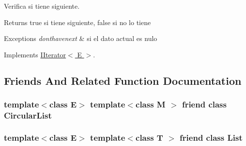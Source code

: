 Verifica si tiene siguiente. 

\begin{DoxyReturn}{Returns}
true si tiene siguiente, false si no lo tiene 
\end{DoxyReturn}

\begin{DoxyExceptions}{Exceptions}
{\em donthavenext} & si el dato actual es nulo \\
\hline
\end{DoxyExceptions}


Implements \hyperlink{class_i_iterator_a8a73f0fb41a66fe98e5e636378759196}{I\-Iterator$<$ E $>$}.



\subsection{Friends And Related Function Documentation}
\hypertarget{class_simple_iterator_ade98163865dd2cf1343ae0a4dbba6b29}{
\subsubsection[{Circular\-List}]{\setlength{\rightskip}{0pt plus 5cm}template$<$class E$>$ template$<$class M $>$ friend class {\bf Circular\-List}\hspace{0.3cm}{\ttfamily [friend]}}}\label{class_simple_iterator_ade98163865dd2cf1343ae0a4dbba6b29}
\hypertarget{class_simple_iterator_a8740adf5dfdafdc64940ab42ed663bd2}{
\subsubsection[{List}]{\setlength{\rightskip}{0pt plus 5cm}template$<$class E$>$ template$<$class T $>$ friend class {\bf List}\hspace{0.3cm}{\ttfamily [friend]}}}\label{class_simple_iterator_a8740adf5dfdafdc64940ab42ed663bd2}


